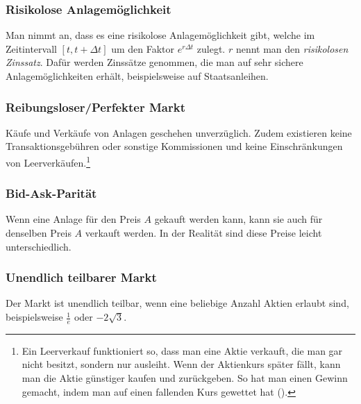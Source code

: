 \documentclass[11pt]{report} %
\begin{document}
\subsubsection*{Risikolose Anlagemöglichkeit}
Man nimmt an, dass es eine risikolose Anlagemöglichkeit gibt, welche im Zeitintervall $[t, t+\Delta t]$ um den Faktor $e^{r\Delta t}$ zulegt. $r$ nennt man den \textit{risikolosen Zinssatz}. Dafür werden Zinssätze genommen, die man auf sehr sichere Anlagemöglichkeiten erhält, beispielsweise auf Staatsanleihen.

\subsubsection*{Reibungsloser/Perfekter Markt}
Käufe und Verkäufe von Anlagen geschehen unverzüglich. Zudem existieren keine Transaktionsgebühren oder sonstige Kommissionen und keine Einschränkungen von Leerverkäufen.\footnote{Ein Leerverkauf funktioniert so, dass man eine Aktie verkauft, die man gar nicht besitzt, sondern nur ausleiht. Wenn der Aktienkurs später fällt, kann man die Aktie günstiger kaufen und zurückgeben. So hat man einen Gewinn gemacht, indem man auf einen fallenden Kurs gewettet hat (\cite{NZZ_2008}).}

\subsubsection*{Bid-Ask-Parität}
Wenn eine Anlage für den Preis $A$ gekauft werden kann, kann sie auch für denselben Preis $A$ verkauft werden. In der Realität sind diese Preise leicht unterschiedlich.

\subsubsection*{Unendlich teilbarer Markt}
Der Markt ist unendlich teilbar, wenn eine beliebige Anzahl Aktien erlaubt sind, beispielsweise $\displaystyle \frac{1}{e}$ oder $-2\sqrt{3}$.
\end{document}
